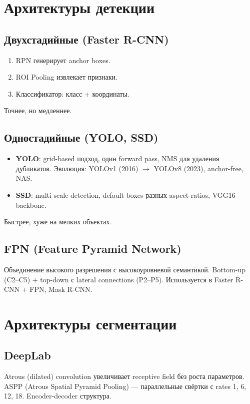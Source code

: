 \documentclass[a4paper,12pt]{article}
\begin{document}
\section{Архитектуры детекции}

\subsection{Двухстадийные (Faster R-CNN)}
\begin{enumerate}
    \item RPN генерирует anchor boxes.
    \item ROI Pooling извлекает признаки.
    \item Классификатор: класс + координаты.
\end{enumerate}
Точнее, но медленнее.

\subsection{Одностадийные (YOLO, SSD)}
\begin{itemize}
    \item \textbf{YOLO}: grid-based подход, один forward pass, NMS для удаления дубликатов. Эволюция: YOLOv1 (2016) $\to$ YOLOv8 (2023), anchor-free, NAS.
    \item \textbf{SSD}: multi-scale detection, default boxes разных aspect ratios, VGG16 backbone.
\end{itemize}
Быстрее, хуже на мелких объектах.

\subsection{FPN (Feature Pyramid Network)}
Объединение высокого разрешения с высокоуровневой семантикой. Bottom-up (C2--C5) + top-down с lateral connections (P2--P5). Используется в Faster R-CNN + FPN, Mask R-CNN.

\section{Архитектуры сегментации}

\subsection{DeepLab}
Atrous (dilated) convolution увеличивает receptive field без роста параметров. ASPP (Atrous Spatial Pyramid Pooling) — параллельные свёртки с rates 1, 6, 12, 18. Encoder-decoder структура.
\end{document}
